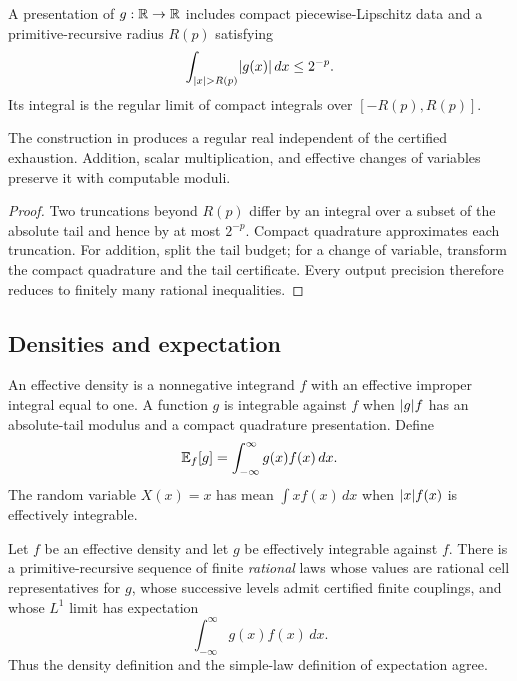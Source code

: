 \begin{definition}
\label{def:improper}
A presentation of \(g:\mathbb R\to\mathbb R\) includes compact piecewise-Lipschitz data and a
primitive-recursive radius \(R(p)\) satisfying
\[
 \int_{\lvert x\rvert>R(p)}\lvert g(x)\rvert\,dx\le2^{-p}.
\]
Its integral is the regular limit of compact integrals over
\([-R(p),R(p)]\).
\end{definition}

\begin{theorem}\label{thm:improper}
The construction in  produces a regular real independent of
the certified exhaustion.  Addition, scalar multiplication, and effective
changes of variables preserve it with computable moduli.
\end{theorem}

\begin{proof}
Two truncations beyond \(R(p)\) differ by an integral over a subset of the
absolute tail and hence by at most \(2^{-p}\).  Compact quadrature approximates
each truncation.  For addition, split the tail budget; for a change of variable,
transform the compact quadrature and the tail certificate.  Every output
precision therefore reduces to finitely many rational inequalities.
\end{proof}

\subsection{Densities and expectation}

\begin{definition}\label{def:density}
An effective density is a nonnegative integrand \(f\) with an effective
improper integral equal to one.  A function \(g\) is integrable against \(f\)
when \(\lvert g\rvert f\) has an absolute-tail modulus and a compact quadrature
presentation.  Define
\[
 \mathbb E_f[g]=\int_{-\infty}^{\infty}g(x)f(x)\,dx.
\]
The random variable \(X(x)=x\) has mean \(\int xf(x)\,dx\) when
\(\lvert x\rvert f(x)\) is effectively integrable.
\end{definition}

\begin{theorem}\label{thm:density-agreement}
Let \(f\) be an effective density and let \(g\) be effectively integrable
against \(f\).  There is a primitive-recursive sequence of finite
\emph{rational} laws whose values are rational cell representatives for
\(g\), whose successive levels admit certified finite couplings, and whose
\(L^1\) limit has expectation
\[
 \int_{-\infty}^{\infty}g(x)f(x)\,dx.
\]
Thus the density definition and the simple-law definition of expectation agree.
\end{theorem}

